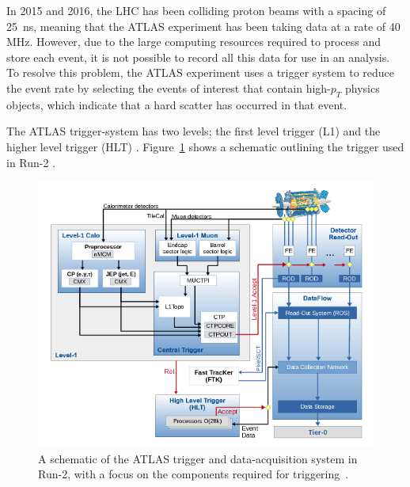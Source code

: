 In 2015 and 2016, the LHC has been colliding proton beams with a spacing of \SI{25}{\nano\second},
meaning that the ATLAS experiment has been taking data at a rate of 40 MHz.
However, due to the large computing resources required to process and store each event,
it is not possible to record all this data for use in an analysis.
To resolve this problem,
the ATLAS experiment uses a trigger system to reduce the event rate by
selecting the events of interest that contain high-$p_{T}$
physics objects, which indicate that a hard scatter has occurred in that event. 

The ATLAS trigger-system has two levels;
the first level trigger (L1) and the higher level trigger (HLT) \cite{det-run2_trigger}.
Figure~\ref{fig:det-trigger_schem} shows a schematic outlining the trigger used in Run-2 \cite{det-run2_triggerPerf}. 

\begin{figure}[!ht]
  \begin{center}
    \includegraphics[width=1\linewidth, angle=0]{figs/Detector/trigger_schem.png}
  \end{center}
  \caption[A schematic of the ATLAS trigger and data-acquisition system in Run-2, with a focus on the components required for triggering.]
          {A schematic of the ATLAS trigger and data-acquisition system in Run-2, with a focus on the components required for triggering~\cite{det-run2_trigger}.}
  \label{fig:det-trigger_schem}
\end{figure}

